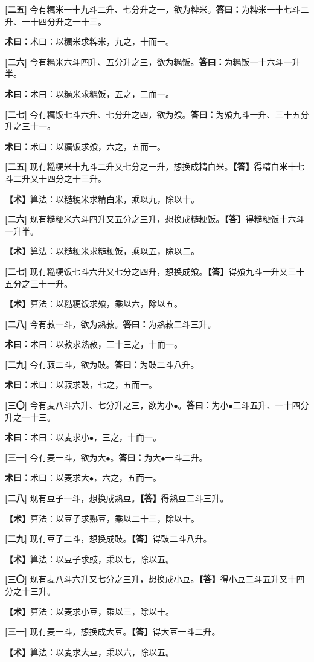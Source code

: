 \documentclass[10pt,a4paper]{article}
\newlength{\lw}
\newlength{\rw}
\newcommand{\bilingc}[2]{%
  \par\vspace{0.1em}%
  \noindent\begin{minipage}[t]{\lw}
  {\small #1}
  \end{minipage}%
  \hfill%
  \begin{minipage}[t]{\rw}
  {\small #2}
  \end{minipage}%
  \vspace{0.1em}%
}
\newcommand{\da}{\textbf{\textcolor{answercolor}{答曰：}}}
\newcommand{\daB}{\textbf{\textcolor{answercolor}{【答】}}}
\newcommand{\shu}{\textbf{\textcolor{methodcolor}{术曰：}}}
\newcommand{\shuB}{\textbf{\textcolor{methodcolor}{【术】}}}
\newcommand{\pn}[1]{\textbf{[#1]}}
\begin{document}
\bilingc{
\pn{二五} 今有糲米一十九斗二升、七分升之一，欲为粺米。\quad\da 为粺米一十七斗二升、一十四分升之一十三。

\shu 术曰：以糲米求粺米，九之，十而一。

\pn{二六} 今有糲米六斗四升、五分升之三，欲为糲饭。\quad\da 为糲饭一十六斗一升半。

\shu 术曰：以糲米求糲饭，五之，二而一。

\pn{二七} 今有糲饭七斗六升、七分升之四，欲为飧。\quad\da 为飧九斗一升、三十五分升之三十一。

\shu 术曰：以糲饭求飧，六之，五而一。
}{
\pn{二五} 现有糙粳米十九斗二升又七分之一升，想换成精白米。\quad\daB 得精白米十七斗二升又十四分之十三升。

\shuB 算法：以糙粳米求精白米，乘以九，除以十。

\pn{二六} 现有糙粳米六斗四升又五分之三升，想换成糙粳饭。\quad\daB 得糙粳饭十六斗一升半。

\shuB 算法：以糙粳米求糙粳饭，乘以五，除以二。

\pn{二七} 现有糙粳饭七斗六升又七分之四升，想换成飧。\quad\daB 得飧九斗一升又三十五分之三十一升。

\shuB 算法：以糙粳饭求飧，乘以六，除以五。
}

\vspace{0.3em}

\bilingc{
\pn{二八} 今有菽一斗，欲为熟菽。\quad\da 为熟菽二斗三升。

\shu 术曰：以菽求熟菽，二十三之，十而一。

\pn{二九} 今有菽二斗，欲为豉。\quad\da 为豉二斗八升。

\shu 术曰：以菽求豉，七之，五而一。

\pn{三〇} 今有麦八斗六升、七分升之三，欲为小$\bullet$。\quad\da 为小$\bullet$二斗五升、一十四分升之一十三。

\shu 术曰：以麦求小$\bullet$，三之，十而一。

\pn{三一} 今有麦一斗，欲为大$\bullet$。\quad\da 为大$\bullet$一斗二升。

\shu 术曰：以麦求大$\bullet$，六之，五而一。
}{
\pn{二八} 现有豆子一斗，想换成熟豆。\quad\daB 得熟豆二斗三升。

\shuB 算法：以豆子求熟豆，乘以二十三，除以十。

\pn{二九} 现有豆子二斗，想换成豉。\quad\daB 得豉二斗八升。

\shuB 算法：以豆子求豉，乘以七，除以五。

\pn{三〇} 现有麦八斗六升又七分之三升，想换成小豆。\quad\daB 得小豆二斗五升又十四分之十三升。

\shuB 算法：以麦求小豆，乘以三，除以十。

\pn{三一} 现有麦一斗，想换成大豆。\quad\daB 得大豆一斗二升。

\shuB 算法：以麦求大豆，乘以六，除以五。
}
\end{document}
